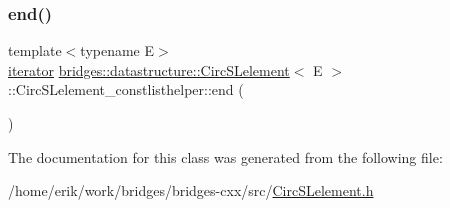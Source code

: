 \mbox{\label{classbridges_1_1datastructure_1_1_circ_s_lelement_1_1_circ_s_lelement__constlisthelper_a93f42a63638e54e427648d7182b44d42}} 
\subsubsection{\texorpdfstring{end()}{end()}}
{\footnotesize\ttfamily template$<$typename E$>$ \\
\hyperlink{classbridges_1_1datastructure_1_1_circ_s_lelement_1_1_circ_s_lelement__constlisthelper_1_1iterator}{iterator} \hyperlink{classbridges_1_1datastructure_1_1_circ_s_lelement}{bridges\+::datastructure\+::\+Circ\+S\+Lelement}$<$ E $>$\+::Circ\+S\+Lelement\+\_\+constlisthelper\+::end (\begin{DoxyParamCaption}{ }\end{DoxyParamCaption})\hspace{0.3cm}{\ttfamily [inline]}}



The documentation for this class was generated from the following file\+:\begin{DoxyCompactItemize}
\item 
/home/erik/work/bridges/bridges-\/cxx/src/\hyperlink{_circ_s_lelement_8h}{Circ\+S\+Lelement.\+h}\end{DoxyCompactItemize}
